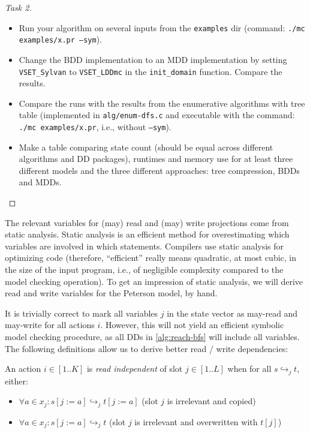 \documentclass[12pt]{article}
\begin{document}
\begin{proof}[Task 2]~\\
\vspace{-2em}
\begin{itemize}
	\item 
Run your algorithm on several inputs from the \texttt{examples} dir
(command: \texttt{./mc examples/x.pr --sym}).

\item
Change the BDD implementation to an MDD implementation by
setting \texttt{VSET\_Sylvan} to \texttt{VSET\_LDDmc} in 
the \texttt{init\_domain} function.
Compare the results.

\item
Compare the runs with the results from the enumerative algorithms with
tree table
(implemented in \texttt{alg/enum-dfs.c} and executable with the command:
\texttt{./mc examples/x.pr}, i.e., without \texttt{--sym}).

\item
Make a table comparing state count (should be equal across different algorithms and
DD packages), runtimes and memory use for at least three different models
and the three different approaches: tree compression, BDDs and MDDs.
\end{itemize}
\vspace{-2em}
\end{proof}

The relevant variables for (may) read and (may) write projections
come from static analysis. Static analysis is an efficient
method for overestimating which variables are involved in
which statements.
Compilers use static analysis for optimizing code
(therefore, ``efficient'' really means quadratic, at most cubic, in the size of the input program, i.e., of negligible complexity compared to the model checking operation).
To get an impression of static analysis,
we will derive read and write variables for the Peterson model, by hand.

It is trivially correct to mark all variables $j$ in the
state vector as may-read and may-write
for all actions $i$. However, this will not yield an efficient
symbolic model checking procedure, as all DDs in \autoref{alg:reach-bfs}
will include all variables.
The following definitions allow us to derive better read / write
dependencies:
\begin{definition}

	An action $i\in [1..K]$ is \emph{read independent} of slot $j \in [1..L]$
	when for all $s \hookrightarrow_j t$, either:
	\begin{itemize}[leftmargin=5mm]
		\item $\forall a\in x_j \colon s[j := a] \hookrightarrow_j t[j := a]$
			\hfill {(slot $j$ is irrelevant and copied)}
		\item $\forall a\in x_j \colon s[j := a] \hookrightarrow_j t$
			\hfill {(slot $j$ is irrelevant and overwritten with $t[j]$)}
	\end{itemize}
\end{definition}
\end{document}
